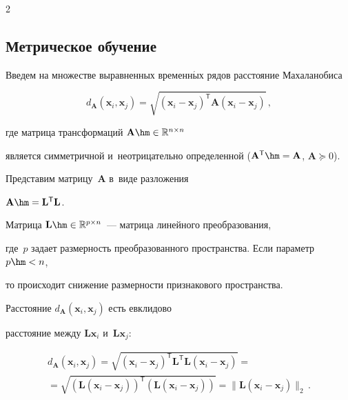 \begin{multicols}{2}
\subsection{Метрическое обучение}





Введем на множестве выравненных временн$\acute{\mbox{ы}}$х рядов расстояние Махаланобиса


$$


    d_\mathbf{A} (\mathbf{x}_i, \mathbf{x}_j) = \sqrt{(\mathbf{x}_i - \mathbf{x}_j)^\mathsf{T} \mathbf{A} (\mathbf{x}_i - \mathbf{x}_j)}\,,


$$


где матрица трансформаций $\mathbf{A} \hm\in \mathbb{R}^{n \times n}$ 


является симметричной и~неотрицательно определенной ($\mathbf{A}^\mathsf{T} \hm= 


\mathbf{A}$, $\mathbf{A} \succeq 0$).


Представим матрицу~$\mathbf{A}$ в~виде разложения 


$\mathbf{A} \hm= \mathbf{L}^\mathsf{T}  \mathbf{L}$.


Матрица $\mathbf{L}\hm \in \mathbb{R}^{p \times n}$~--- мат\-ри\-ца линейного преобразования, 


где~$p$ задает раз\-мер\-ность преобразованного пространства. Если па\-ра\-метр $p\hm < n$, 


то происходит снижение размерности признакового пространства.





Расстояние $d_\mathbf{A} (\mathbf{x}_i, \mathbf{x}_j)$ есть евклидово 


рас\-сто\-яние между $\mathbf{Lx}_i$ и~$\mathbf{Lx}_j$:


\begin{multline*}


    d_\mathbf{A} (\mathbf{x}_i, \mathbf{x}_j) = \sqrt{(\mathbf{x}_i - 


    \mathbf{x}_j)^\mathsf{T} \mathbf{L}^\mathsf{T} \mathbf{L} (\mathbf{x}_i - 


    \mathbf{x}_j)} = {}\\


    {}=\sqrt{(\mathbf{L} (\mathbf{x}_i - \mathbf{x}_j))^\mathsf{T} 


    (\mathbf{L} (\mathbf{x}_i - \mathbf{x}_j))} =


     \|\mathbf{L} (\mathbf{x}_i - \mathbf{x}_j)\|_2\,.



\end{multline*}
\end{multicols}
